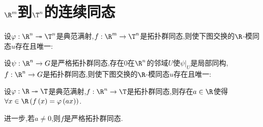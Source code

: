\section{\texorpdfstring{$\R^{m}$}{Rm}到\texorpdfstring{$\T^{n}$}{Tn}的连续同态}

\begin{proposition}{}{}
	设$\varphi:\R^{n}\twoheadrightarrow\T^{n}$是典范满射,$f:\R^{m}\to\T^{n}$是拓扑群同态,则使下图交换的$\R$-模同态$u$存在且唯一:
	\begin{center}
	\end{center}
\end{proposition}

\begin{corollary}{}{}
	设$\psi:\R^{n}\to G$是严格拓扑群同态,存在$0$在$\R^{n}$的邻域$U$使$\psi|_{U}$是局部同构,$f:\R^{n}\to G$是拓扑群同态,则使下图交换的$\R$-模同态$u$存在且唯一:
	\begin{center}
	\end{center}
\end{corollary}

\begin{proposition}{}{}
	设$\varphi:\R\twoheadrightarrow\T$是典范满射,$f:\R^{n}\to\T$是拓扑群同态,则存在$a\in\R$使得$\forall x\in\R\left(f\left(x\right)=\varphi\left(ax\right)\right)$.
	
	进一步,若$a\neq 0$,则$f$是严格拓扑群同态.
\end{proposition}